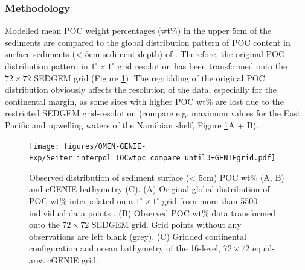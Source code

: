 \documentclass[gmd, manuscript]{copernicus}
\begin{document}
\subsubsection{Methodology}
Modelled mean POC weight percentages (wt\%) in the upper 5cm of the sediments are compared to the global distribution pattern of POC content in surface sediments 
(< 5cm sediment depth) of \citet{seiter_organic_2004}. 
Therefore, the original POC distribution pattern in $1^\circ \times 1^\circ$ grid resolution \citep[interpolated from > 5500 measurements, compare][]{seiter_organic_2004} has been transformed onto the $72\times 72$ SEDGEM grid 
(Figure \ref{fig:TOC_Obs_regridded}). The regridding of the original POC distribution obviously affects the resolution of the data, especially for the continental margin, as some sites with higher POC wt\% are lost due to the 
restricted SEDGEM grid-resolution (compare e.g. maximum values for the East Pacific and upwelling waters of the Namibian shelf, Figure \ref{fig:TOC_Obs_regridded}A + B). 

\begin{figure}[htbp]
\begin{center}
	\texttt{[image: figures/OMEN-GENIE-Exp/Seiter\_interpol\_TOCwtpc\_compare\_until3+GENIEgrid.pdf]}
	\caption{Observed distribution of sediment surface (< 5cm) POC wt\% (A, B) and cGENIE bathymetry (C). 
	(A) Original global distribution of POC wt\% interpolated on a $1^\circ \times 1^\circ$ grid from more than 5500 individual data points 
	\citep[compare][for the interpolation procedure]{seiter_organic_2004}. 
	(B) Observed POC wt\% data transformed onto the $72\times 72$ SEDGEM grid. Grid points without any observations are left blank (grey). 
	(C) Gridded continental configuration and ocean bathymetry of the 16-level, $72\times 72$ equal-area cGENIE grid.
	}\label{fig:TOC_Obs_regridded}
\end{center}
\end{figure}
\end{document}
